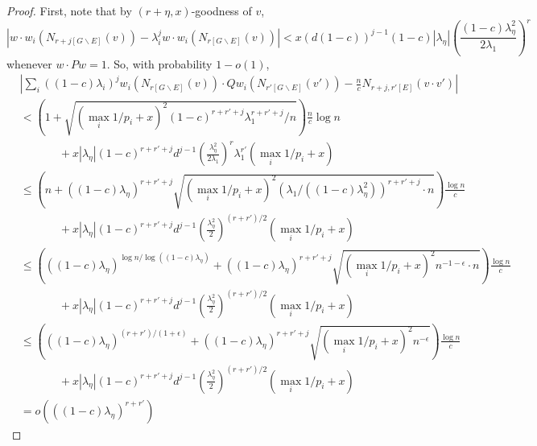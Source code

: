 \documentclass[11pt]{article}
\newcommand{\1}{\mathbb{1}}
\begin{document}
\begin{proof}
First, note that by $(r+\eta,x)$-goodness of $v$, \[|w\cdot w_i(N_{r+j[G\backslash E]}(v))-\lambda_i^j w\cdot w_i(N_{r[G\backslash E]}(v))|<x(d(1-c))^{j-1}(1-c)|\lambda_{\eta}|\left(\frac{(1-c)\lambda_{\eta}^2}{2\lambda_1}\right)^{r}\] whenever $w\cdot Pw=1$. So, with probability $1-o(1)$, 
\begin{align*}
&|\sum_i ((1-c)\lambda_i)^{j}w_i(N_{r[G\backslash E]}(v))\cdot Qw_i(N_{r'[G\backslash E]}(v'))-\frac{n}{c}N_{r+j,r'[E]}(v\cdot v')|\\
&<\left(1+\sqrt{(\max_i 1/p_i+x)^2(1-c)^{r+r'+j}\lambda_1^{r+r'+j}/n}\right)\frac{n}{c}\log n\\
&\phantom{xxxxxx}+x|\lambda_{\eta}|(1-c)^{r+r'+j}d^{j-1}\left(\frac{\lambda_{\eta}^2}{2\lambda_1}\right)^{r}\lambda_1^{r'}(\max_i 1/p_i+x)\\
&\le \left(n+((1-c)\lambda_{\eta})^{r+r'+j}\sqrt{(\max_i 1/p_i+x)^2(\lambda_1/((1-c)\lambda_{\eta}^2))^{r+r'+j}\cdot n}\right)\frac{\log n}{c}\\
&\phantom{xxxxxx}+x|\lambda_{\eta}|(1-c)^{r+r'+j}d^{j-1}\left(\frac{\lambda_{\eta}^2}{2}\right)^{(r+r')/2}(\max_i 1/p_i+x)\\
& \le \left(((1-c)\lambda_{\eta})^{\log n/\log((1-c)\lambda_{\eta})}+((1-c)\lambda_{\eta})^{r+r'+j}\sqrt{(\max_i 1/p_i+x)^2n^{-1-\epsilon}\cdot n}\right)\frac{\log n}{c}\\
&\phantom{xxxxxx}+x|\lambda_{\eta}|(1-c)^{r+r'+j}d^{j-1}\left(\frac{\lambda_{\eta}^2}{2}\right)^{(r+r')/2}(\max_i 1/p_i+x)\\
&\le \left(((1-c)\lambda_{\eta})^{(r+r')/(1+\epsilon)}+((1-c)\lambda_{\eta})^{r+r'+j}\sqrt{(\max_i 1/p_i+x)^2n^{-\epsilon}}\right)\frac{\log n}{c}\\
&\phantom{xxxxxx}+x|\lambda_{\eta}|(1-c)^{r+r'+j}d^{j-1}\left(\frac{\lambda_{\eta}^2}{2}\right)^{(r+r')/2}(\max_i 1/p_i+x)\\
&=o(((1-c)\lambda_{\eta})^{r+r'})
\end{align*}


\end{proof}
\end{document}
